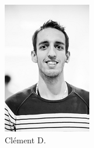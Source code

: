 \begin{figure}[h!]
\begin{subfigure}[b]{0.2\textwidth}
                \includegraphics[width=\textwidth]{images/clement-d-serieux.png}
                \caption{Clément D.}
            \end{subfigure}
            \begin{subfigure}[b]{0.2\textwidth}

\end{subfigure}
\end{figure}
